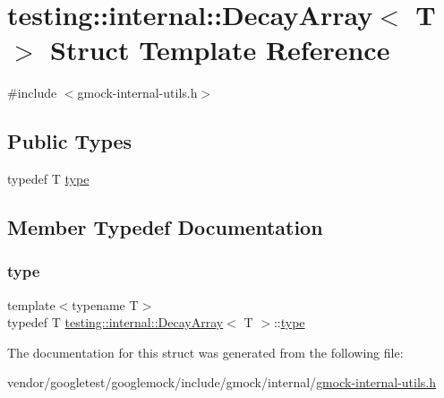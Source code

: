 \hypertarget{structtesting_1_1internal_1_1_decay_array}{}\section{testing\+:\+:internal\+:\+:Decay\+Array$<$ T $>$ Struct Template Reference}
\label{structtesting_1_1internal_1_1_decay_array}


{\ttfamily \#include $<$gmock-\/internal-\/utils.\+h$>$}

\subsection*{Public Types}
\begin{DoxyCompactItemize}
\item 
typedef T \hyperlink{structtesting_1_1internal_1_1_decay_array_a39803f9bafd56bc4531f86eb34fe9c0f}{type}
\end{DoxyCompactItemize}


\subsection{Member Typedef Documentation}
\mbox{\label{structtesting_1_1internal_1_1_decay_array_a39803f9bafd56bc4531f86eb34fe9c0f}} 
\subsubsection{\texorpdfstring{type}{type}}
{\footnotesize\ttfamily template$<$typename T$>$ \\
typedef T \hyperlink{structtesting_1_1internal_1_1_decay_array}{testing\+::internal\+::\+Decay\+Array}$<$ T $>$\+::\hyperlink{structtesting_1_1internal_1_1_decay_array_a39803f9bafd56bc4531f86eb34fe9c0f}{type}}



The documentation for this struct was generated from the following file\+:\begin{DoxyCompactItemize}
\item 
vendor/googletest/googlemock/include/gmock/internal/\hyperlink{gmock-internal-utils_8h}{gmock-\/internal-\/utils.\+h}\end{DoxyCompactItemize}
